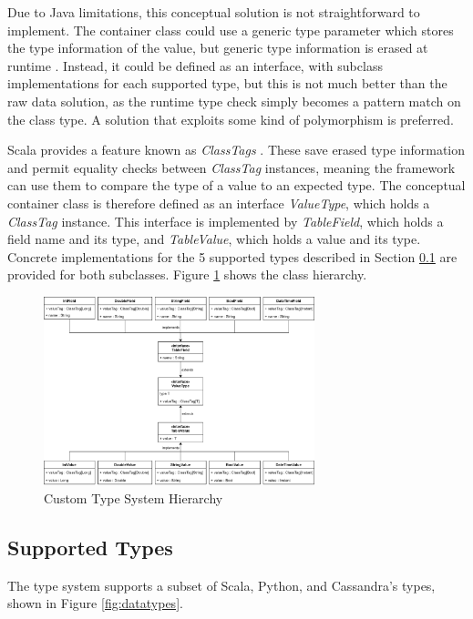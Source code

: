 Due to Java limitations, this conceptual solution is not straightforward to implement. The container class could use a generic type parameter which stores the type information of the value, but generic type information is erased at runtime \cite{ghosh2004generics}. Instead, it could be defined as an interface, with subclass implementations for each supported type, but this is not much better than the raw data solution, as the runtime type check simply becomes a pattern match on the class type. A solution that exploits some kind of polymorphism is preferred. 

Scala provides a feature known as \textit{ClassTags} \cite{scalaclasstags}. These save erased type information and permit equality checks between \textit{ClassTag} instances, meaning the framework can use them to compare the type of a value to an expected type. The conceptual container class is therefore defined as an interface \textit{ValueType}, which holds a \textit{ClassTag} instance. This interface is implemented by \textit{TableField}, which holds a field name and its type, and \textit{TableValue}, which holds a value and its type. Concrete implementations for the 5 supported types described in Section \ref{subsec:supported-types} are provided for both subclasses. Figure \ref{fig:type-system-hierarchy} shows the class hierarchy.

\begin{figure}[htp]
	\centering
	\includegraphics[width=0.7\textwidth]{chapters/diagrams/implementation/type-system-hierarchy}
	\caption{Custom Type System Hierarchy}
	\label{fig:type-system-hierarchy}
\end{figure}

\subsection{Supported Types}\label{subsec:supported-types}
The type system supports a subset of Scala, Python, and Cassandra's types, shown in Figure \ref{fig:datatypes}.


